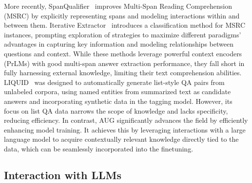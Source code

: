 More recently, SpanQualifier~\cite{huang2023qualifier} improves Multi-Span Reading Comprehension (MSRC) by explicitly representing spans and modeling interactions within and between them.
Iterative Extractor~\cite{zhang2023many} introduces a classification method for MSRC instances, prompting exploration of strategies to maximize different paradigms' advantages in capturing key information and modeling relationships between questions and context.
While these methods leverage powerful context encoders (PrLMs) with good multi-span answer extraction performance, they fall short in fully harnessing external knowledge, limiting their text comprehension abilities.
LIQUID~\cite{lee2023liquid} was designed to automatically generate list-style QA pairs from unlabeled corpora, using named entities from summarized text as candidate answers and incorporating synthetic data in the tagging model. However, its focus on list QA data narrows the scope of knowledge and lacks specificity, reducing efficiency.
In contrast, AUG significantly advances the field by efficiently enhancing model training. It achieves this by leveraging interactions with a large language model to acquire contextually relevant knowledge directly tied to the data, which can be seamlessly incorporated into the finetuning.


\subsection{Interaction with LLMs}

